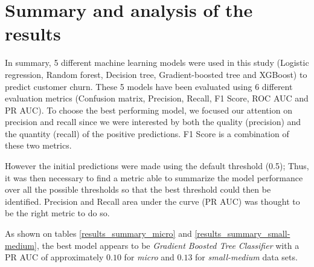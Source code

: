 \documentclass[LaM,binding=0.6cm, english]{sapthesis}
\begin{document}
\section{Summary and analysis of the results}

In summary, 5 different machine learning models were used in this study (Logistic regression, Random forest, Decision tree, Gradient-boosted tree and XGBoost) to predict customer churn. These 5 models have been evaluated using 6 different evaluation metrics (Confusion matrix, Precision, Recall, F1 Score, ROC AUC and PR AUC). To choose the best performing model, we focused our attention on precision and recall since we were interested by both the quality (precision) and the quantity (recall) of the positive predictions. F1 Score is a combination of these two metrics. 

However the initial predictions were made using the default threshold (0.5); Thus, it was then necessary to find a metric able to summarize the model performance over all the possible thresholds so that the best threshold could then be identified. Precision and Recall area under the curve (PR AUC) was thought to be the right metric to do so.

As shown on tables \ref{results_summary_micro} and \ref{results_summary_small-medium}, the best model appears to be \textit{Gradient Boosted Tree Classifier} with a PR AUC of approximately $0.10$ for \textit{micro} and $0.13$ for \textit{small-medium} data sets. 

\begin{table}[!ht]
\centering
{}
\vspace{2mm}
\caption{Results summary (Micro)}
\label{results_summary_micro}
\end{table}
\end{document}
